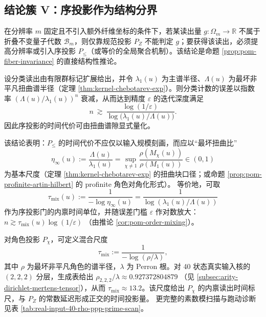 \subsection{结论簇 V：序投影作为结构分界}\label{subsec:pom-order-bottleneck}
\begin{corollary}[序投影的不可约读出性]\label{cor:pom-order-bottleneck}
在分辨率 $m$ 固定且不引入额外纤维坐标的条件下，若某读出量 $g:\Omega_m\to\mathbb{R}$ 不属于折叠不变量子代数 $\mathcal{B}_m$，则仅靠规范投影 $P_Z$ 不能判定 $g$；要获得该读出，必须提高分辨率或引入序投影 $P_{\le}$（或等价的全局聚合机制）。该结论是命题 \ref{prop:pom-fiber-invariance} 的直接结构性推论。
\end{corollary}

\begin{corollary}[序投影的混合时间尺度]\label{cor:pom-order-mixing}
设分类读出由有限群标记扩展给出，并令 $\lambda_1(u)$ 为主谱半径、$\Lambda(u)$ 为最坏非平凡扭曲谱半径（定理 \ref{thm:kernel-chebotarev-exp}）。则分类计数的误差以指数率 $(\Lambda(u)/\lambda_1(u))^n$ 衰减，从而达到精度 $\varepsilon$ 的迭代深度满足
\[
n\ \gtrsim\ \frac{\log(1/\varepsilon)}{\log\!\bigl(\lambda_1(u)/\Lambda(u)\bigr)}.
\]
因此序投影的时间代价可由扭曲谱隙显式量化。
\end{corollary}

\begin{remark}[序投影的谱量刻度（谱隙=本体时间尺度）]\label{rem:pom-order-mixing-scale}
该结论表明：$P_{\le}$ 的时间代价不应仅以输入规模刻画，而应以“最坏扭曲比”
\[
\eta_\infty(u):=\frac{\Lambda(u)}{\lambda_1(u)}
=\sup_{\chi\neq 1}\frac{\rho(M_\chi(u))}{\rho(M_1(u))}
\in(0,1)
\]
为基本尺度（定理 \ref{thm:kernel-chebotarev-exp} 的扭曲块口径；或命题 \ref{prop:pom-profinite-artin-hilbert} 的 profinite 角色对角化形式）。
等价地，可取
\[
\tau_{\mathrm{mix}}(u):=\frac{1}{-\log \eta_\infty(u)}=\frac{1}{\log(\lambda_1(u)/\Lambda(u))}
\]
作为序投影门的内禀时间单位，并随误差门槛 $\varepsilon$ 作对数放大：
\(
n\gtrsim \tau_{\mathrm{mix}}(u)\log(1/\varepsilon)
\)
（由推论 \ref{cor:pom-order-mixing}）。
\end{remark}

\begin{remark}[角色投影的混合尺度与数值锚点]\label{rem:pom-chi-mixing}
对角色投影 $P_\chi$，可定义混合尺度
\[
\tau_{\mathrm{mix}}:=\frac{1}{-\log(\rho/\lambda)},
\]
其中 $\rho$ 为最坏非平凡角色的谱半径，$\lambda$ 为 Perron 根。对 40 状态真实输入核的 $(2,2,2)$ 分层，生成表给出
\(
\rho_{2,2,2}/\lambda\approx 0.927372804879
\)
（见 \ref{subsec:arity-dirichlet-mertens-tensor}），从而 $\tau_{\mathrm{mix}}\approx 13.2$。该尺度给出 $P_\chi$ 的内禀读出时间标尺，与 $P_Z$ 的常数延迟形成正交的时间投影量。
更完整的素数模扫描与跑动诊断见表 \ref{tab:real-input-40-rho-ppp-prime-scan}。
\end{remark}


